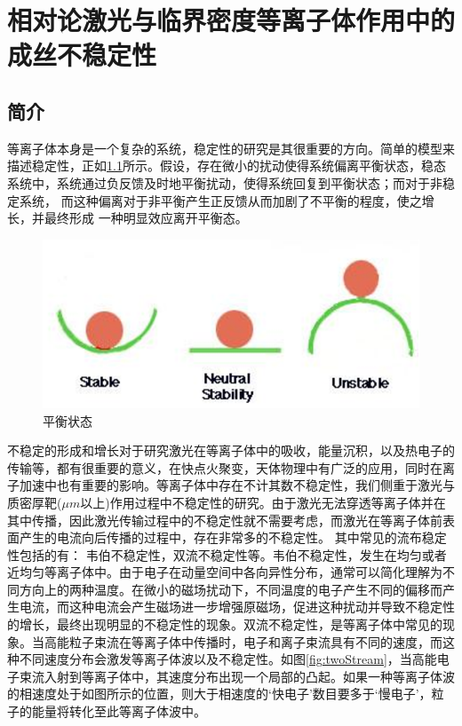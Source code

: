 \chapter{相对论激光与临界密度等离子体作用中的成丝不稳定性}
\label{chap:instability}



\section{简介}
等离子体本身是一个复杂的系统，稳定性的研究是其很重要的方向。简单的模型来描述稳定性，正如\ref{fig:stable}所示。假设，存在微小的扰动使得系统偏离平衡状态，稳态系统中，系统通过负反馈及时地平衡扰动，使得系统回复到平衡状态；而对于非稳定系统，  而这种偏离对于非平衡产生正反馈从而加剧了不平衡的程度，使之增长，并最终形成 一种明显效应离开平衡态。
\begin{figure}[!htbp]
  \centering
  \includegraphics[width=\MyFactor\textwidth]{Img/stable.eps}
  \caption{平衡状态}
  \label{fig:stable}
\end{figure}



 不稳定的形成和增长对于研究激光在等离子体中的吸收，能量沉积，以及热电子的传输等，都有很重要的意义，在快点火聚变\cite{tabak1994ignition}，天体物理中有广泛的应用，同时在离子加速中也有重要的影响。等离子体中存在不计其数不稳定性，我们侧重于激光与质密厚靶($\mu m$以上)作用过程中不稳定性的研究。由于激光无法穿透等离子体并在其中传播，因此激光传输过程中的不稳定性就不需要考虑，而激光在等离子体前表面产生的电流向后传播的过程中，存在非常多的不稳定性。
其中常见的流布稳定性包括的有： 韦伯不稳定性\cite{weibel1959spontaneously}，双流不稳定性等。韦伯不稳定性，发生在均匀或者近均匀等离子体中。由于电子在动量空间中各向异性分布，通常可以简化理解为不同方向上的两种温度。在微小的磁场扰动下，不同温度的电子产生不同的偏移而产生电流，而这种电流会产生磁场进一步增强原磁场，促进这种扰动并导致不稳定性的增长，最终出现明显的不稳定性的现象。双流不稳定性，是等离子体中常见的现象。当高能粒子束流在等离子体中传播时，电子和离子束流具有不同的速度，而这种不同速度分布会激发等离子体波以及不稳定性。如图\ref{fig:twoStream}，当高能电子束流入射到等离子体中，其速度分布出现一个局部的凸起。如果一种等离子体波的相速度处于如图所示的位置，则大于相速度的‘快电子’数目要多于‘慢电子’，粒子的能量将转化至此等离子体波中。

